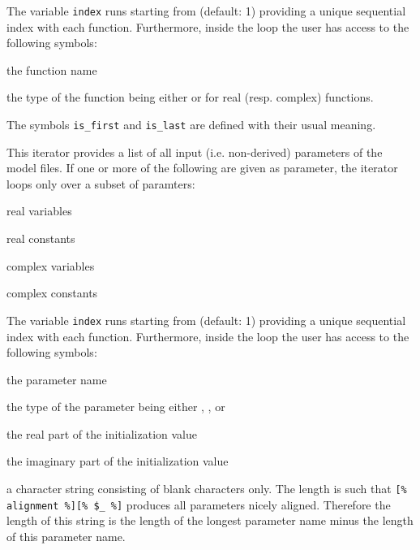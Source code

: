 \documentclass[11pt,a4paper]{refrep}
\begin{document}
\begin{description}
   The variable \texttt{index} runs starting from  (default: 1)
   providing a unique sequential index with each function.
   Furthermore, inside the
   loop the user has access to the following symbols:
   \begin{description}\small
   \item[\texttt{\$\_}] the function name
   \item[\texttt{type}] the type of the function
      being either  or  for real (resp. complex)
      functions.
   \end{description}
   The symbols \texttt{is\_first} and \texttt{is\_last} are defined with
   their usual meaning.
\item[\texttt{parameters}
   {[\texttt{base=}\synt{base}]}
   {[\texttt{R}]}
   {[\texttt{RP}]}
   {[\texttt{C}]}
   {[\texttt{CP}]}
] This iterator provides a list of all input (i.e. non-derived)
   parameters of the model files.
   If one or more of the following are given as parameter,
   the iterator loops only over a subset of paramters:
   \begin{description}\small
   \item[\texttt{R}] real variables
   \item[\texttt{RP}] real constants
   \item[\texttt{C}] complex variables
   \item[\texttt{CP}] complex constants
   \end{description}
   The variable \texttt{index} runs starting from  (default: 1)
   providing a unique sequential index with each function.
   Furthermore, inside the
   loop the user has access to the following symbols:
   \begin{description}\small
   \item[\texttt{\$\_}] the parameter name
   \item[\texttt{type}] the type of the parameter
      being either , ,  or 
   \item[\texttt{real}] the real part of the initialization value
   \item[\texttt{imag}] the imaginary part of the initialization value
   \item[\texttt{alignment}] a character string consisting of blank characters
      only. The length is such that \lstinline{[% alignment %][% $_ %]}
      produces all parameters nicely aligned. Therefore the length of
      this string is the length of the longest parameter name minus
      the length of this parameter name.

\end{description}
\end{description}
\end{document}

